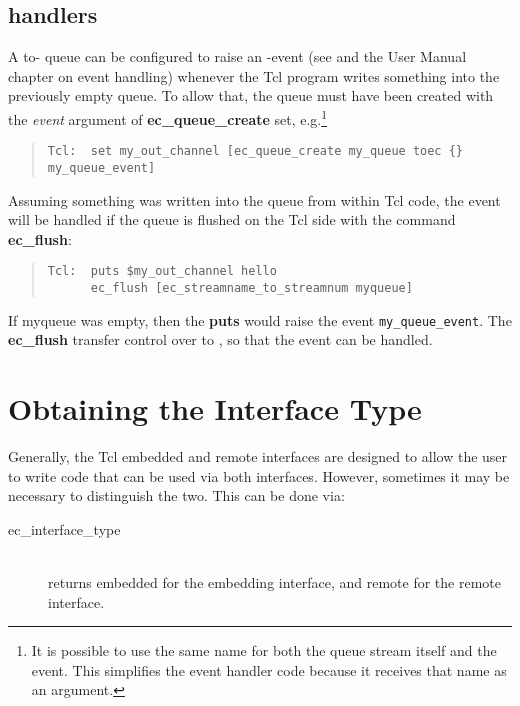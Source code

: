 \subsection{{\eclipse} handlers}
\label{secqevent}
A to-{\eclipse} queue can be configured to
raise an {\eclipse}-event (see
and the User Manual chapter on event handling)
whenever the Tcl program writes something into the
previously empty queue.
To allow that, the queue must have been created with the {\it event\/}
argument of {\bf ec_queue_create} set, 
e.g.\footnote{It is possible to use the same name for both the queue stream itself and
the event. This simplifies the event handler code because it receives that
name as an argument.}
\begin{quote}\begin{verbatim}
Tcl:  set my_out_channel [ec_queue_create my_queue toec {} my_queue_event]
\end{verbatim}\end{quote}
Assuming something was written into the queue from within Tcl code, the
{\eclipse} event will be handled if the queue is flushed on the Tcl side
with the command {\bf ec_flush}:

\begin{quote}\begin{verbatim}
Tcl:  puts $my_out_channel hello
      ec_flush [ec_streamname_to_streamnum myqueue]
\end{verbatim}\end{quote}

If myqueue was empty, then the {\bf puts} would raise the event
\verb'my_queue_event'. The {\bf ec_flush} transfer control over to
{\eclipse}, so that the event can be handled.


\section{Obtaining the Interface Type}

Generally, the Tcl embedded and remote interfaces are designed to allow the
user to write code that can be used via both interfaces. However, sometimes
it may be necessary to distinguish the two. This can be done via:

\begin{description}
\item[ec_interface_type]\ \\
	returns embedded for the embedding interface, and remote for the
        remote interface.
\end{description}


